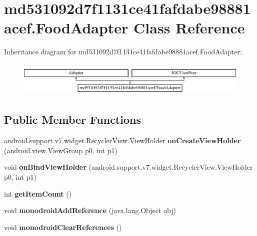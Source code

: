 \hypertarget{classmd531092d7f1131ce41fafdabe98881acef_1_1_food_adapter}{}\section{md531092d7f1131ce41fafdabe98881acef.\+Food\+Adapter Class Reference}
\label{classmd531092d7f1131ce41fafdabe98881acef_1_1_food_adapter}
Inheritance diagram for md531092d7f1131ce41fafdabe98881acef.\+Food\+Adapter\+:\begin{figure}[H]
\begin{center}
\leavevmode
\includegraphics[height=1.681682cm]{classmd531092d7f1131ce41fafdabe98881acef_1_1_food_adapter}
\end{center}
\end{figure}
\subsection*{Public Member Functions}
\begin{DoxyCompactItemize}
\item 
\mbox{\label{classmd531092d7f1131ce41fafdabe98881acef_1_1_food_adapter_a080a2e7e64648489d34384fcef946fe3}} 
android.\+support.\+v7.\+widget.\+Recycler\+View.\+View\+Holder {\bfseries on\+Create\+View\+Holder} (android.\+view.\+View\+Group p0, int p1)
\item 
\mbox{\label{classmd531092d7f1131ce41fafdabe98881acef_1_1_food_adapter_a51d2d9ac91d0d750a9da59da7b9da3f6}} 
void {\bfseries on\+Bind\+View\+Holder} (android.\+support.\+v7.\+widget.\+Recycler\+View.\+View\+Holder p0, int p1)
\item 
\mbox{\label{classmd531092d7f1131ce41fafdabe98881acef_1_1_food_adapter_a1625f850fe5e159671df1bae33ff651f}} 
int {\bfseries get\+Item\+Count} ()
\item 
\mbox{\label{classmd531092d7f1131ce41fafdabe98881acef_1_1_food_adapter_a28f659bd2d9287984b811beb7bc64dbb}} 
void {\bfseries monodroid\+Add\+Reference} (java.\+lang.\+Object obj)
\item 
\mbox{\label{classmd531092d7f1131ce41fafdabe98881acef_1_1_food_adapter_a50368a13bdf30bc18c72c731d222a4df}} 
void {\bfseries monodroid\+Clear\+References} ()
\end{DoxyCompactItemize}
